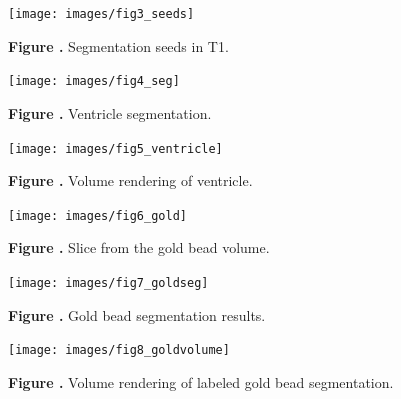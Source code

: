 \documentclass{frontiersMED} %
\begin{document}
\begin{figure}
\begin{center}
\texttt{[image: images/fig3\_seeds]}
\end{center}
 \textbf{\label{fig:03} Figure .}{ Segmentation seeds in T1. }
\end{figure}

\begin{figure}
\begin{center}
\texttt{[image: images/fig4\_seg]}
\end{center}
 \textbf{\label{fig:04} Figure .}{ Ventricle segmentation. }
\end{figure}


\begin{figure}
\begin{center}
\texttt{[image: images/fig5\_ventricle]}
\end{center}
 \textbf{\label{fig:05} Figure .}{ Volume rendering of ventricle. }
\end{figure}

\begin{figure}
\begin{center}
\texttt{[image: images/fig6\_gold]}
\end{center}
 \textbf{\label{fig:06} Figure .}{ Slice from the gold bead volume. }
\end{figure}

\begin{figure}
\begin{center}
\texttt{[image: images/fig7\_goldseg]}
\end{center}
 \textbf{\label{fig:07} Figure .}{ Gold bead segmentation results. }
\end{figure}

\begin{figure}
\begin{center}
\texttt{[image: images/fig8\_goldvolume]}
\end{center}
 \textbf{\label{fig:08} Figure .}{ Volume rendering of labeled gold bead segmentation. }
\end{figure}




\end{document}
